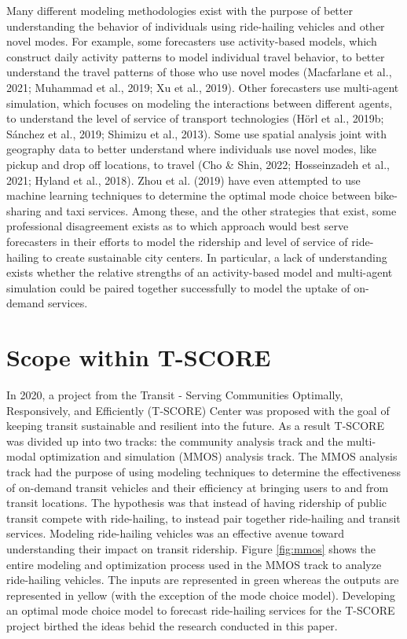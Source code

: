 \documentclass[fancy, masters]{byuthesis}
\begin{document}
Many different modeling methodologies exist with the purpose of better understanding the behavior of individuals using ride-hailing vehicles and other novel modes. For example, some forecasters use activity-based models, which construct daily activity patterns to model individual travel behavior, to better understand the travel patterns of those who use novel modes (Macfarlane et al., 2021; Muhammad et al., 2019; Xu et al., 2019). Other forecasters use multi-agent simulation, which focuses on modeling the interactions between different agents, to understand the level of service of transport technologies (Hörl et al., 2019b; Sánchez et al., 2019; Shimizu et al., 2013). Some use spatial analysis joint with geography data to better understand where individuals use novel modes, like pickup and drop off locations, to travel (Cho \& Shin, 2022; Hosseinzadeh et al., 2021; Hyland et al., 2018). Zhou et al. (2019) have even attempted to use machine learning techniques to determine the optimal mode choice between bike-sharing and taxi services. Among these, and the other strategies that exist, some professional disagreement exists as to which approach would best serve forecasters in their efforts to model the ridership and level of service of ride-hailing to create sustainable city centers. In particular, a lack of understanding exists whether the relative strengths of an activity-based model and multi-agent simulation could be paired together successfully to model the uptake of on-demand services.

\hypertarget{scope-within-t-score}{%
\section{Scope within T-SCORE}\label{scope-within-t-score}}

In 2020, a project from the Transit - Serving Communities Optimally, Responsively, and Efficiently (T-SCORE) Center was proposed with the goal of keeping transit sustainable and resilient into the future. As a result T-SCORE was divided up into two tracks: the community analysis track and the multi-modal optimization and simulation (MMOS) analysis track. The MMOS analysis track had the purpose of using modeling techniques to determine the effectiveness of on-demand transit vehicles and their efficiency at bringing users to and from transit locations. The hypothesis was that instead of having ridership of public transit compete with ride-hailing, to instead pair together ride-hailing and transit services. Modeling ride-hailing vehicles was an effective avenue toward understanding their impact on transit ridership. Figure \ref{fig:mmos} shows the entire modeling and optimization process used in the MMOS track to analyze ride-hailing vehicles. The inputs are represented in green whereas the outputs are represented in yellow (with the exception of the mode choice model). Developing an optimal mode choice model to forecast ride-hailing services for the T-SCORE project birthed the ideas behid the research conducted in this paper.
\end{document}
